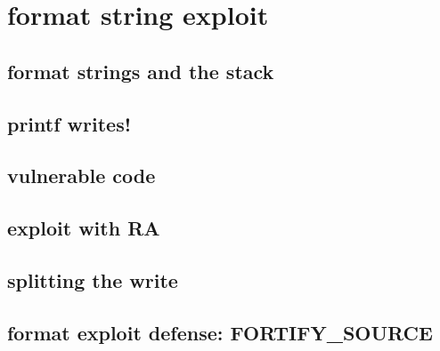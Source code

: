
\section{format string exploit}

\subsection{format strings and the stack}


\subsection{printf writes!}


\subsection{vulnerable code}


\subsection{exploit with RA}


\subsection{splitting the write}


\subsection{format exploit defense: FORTIFY\_SOURCE}

